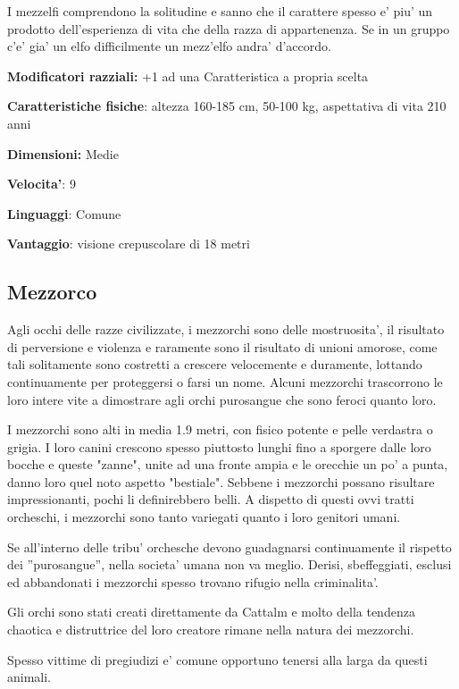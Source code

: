 \documentclass[a4paper,11pt,twoside,openany]{book}
\begin{document}
I mezzelfi comprendono la solitudine e sanno che il carattere spesso e' piu' un prodotto dell'esperienza di vita che della razza di appartenenza. Se in un gruppo c'e' gia' un elfo difficilmente un mezz'elfo andra' d'accordo.

\textbf{Modificatori razziali:} +1 ad una Caratteristica a propria
scelta

\textbf{Caratteristiche fisiche}: altezza 160-185 cm, 50-100 kg, aspettativa di vita 210 anni

\textbf{Dimensioni:} Medie

\textbf{Velocita'}: 9

\textbf{Linguaggi}: Comune

\textbf{Vantaggio}: visione crepuscolare di 18 metri


\subsection{Mezzorco}

\label{mezzorco}

Agli occhi delle razze civilizzate, i mezzorchi sono delle mostruosita', il risultato di perversione e violenza e raramente sono il risultato di unioni amorose, come tali solitamente sono costretti a crescere velocemente e duramente, lottando continuamente per proteggersi o farsi un nome. Alcuni mezzorchi trascorrono le loro intere vite a dimostrare agli orchi purosangue che sono feroci quanto loro.

I mezzorchi sono alti in media 1.9 metri, con fisico potente e pelle verdastra o grigia. I loro canini crescono spesso piuttosto lunghi fino a sporgere dalle loro bocche e queste "zanne", unite ad una fronte ampia e le orecchie un po' a punta, danno loro quel noto aspetto "bestiale". Sebbene i mezzorchi possano risultare impressionanti, pochi li definirebbero belli. A dispetto di questi ovvi tratti orcheschi, i mezzorchi sono tanto variegati quanto i loro genitori umani.

Se all'interno delle tribu' orchesche devono guadagnarsi continuamente il rispetto dei ''purosangue'', nella societa' umana non va meglio. Derisi, sbeffeggiati, esclusi ed abbandonati i mezzorchi spesso trovano rifugio nella criminalita'.

Gli orchi sono stati creati direttamente da Cattalm e molto della tendenza chaotica e distruttrice del loro creatore rimane nella natura dei mezzorchi.

Spesso vittime di pregiudizi e' comune opportuno tenersi alla larga da questi animali.
\end{document}
